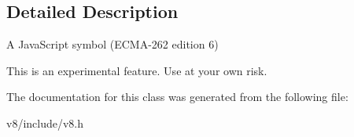 \subsection{Detailed Description}
A Java\+Script symbol (E\+C\+M\+A-\/262 edition 6)

This is an experimental feature. Use at your own risk. 

The documentation for this class was generated from the following file\+:\begin{DoxyCompactItemize}
\item 
v8/include/v8.\+h\end{DoxyCompactItemize}
